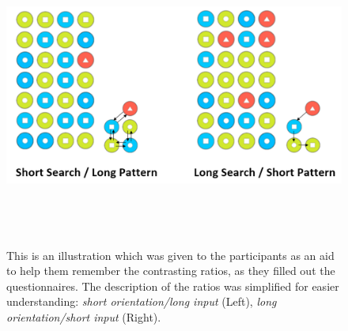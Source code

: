 \begin{figure}[H]
\includegraphics[width=15cm, height=10cm]{Chapters/graphics/illustration.PNG}
\caption{This is an illustration which was given to the participants as an aid to help them remember the contrasting ratios, as they filled out the questionnaires. The description of the ratios was simplified for easier understanding: \textit{short orientation/long input} (Left), \textit{long orientation/short input} (Right).}
\label{fig:illustration}
\end{figure}




